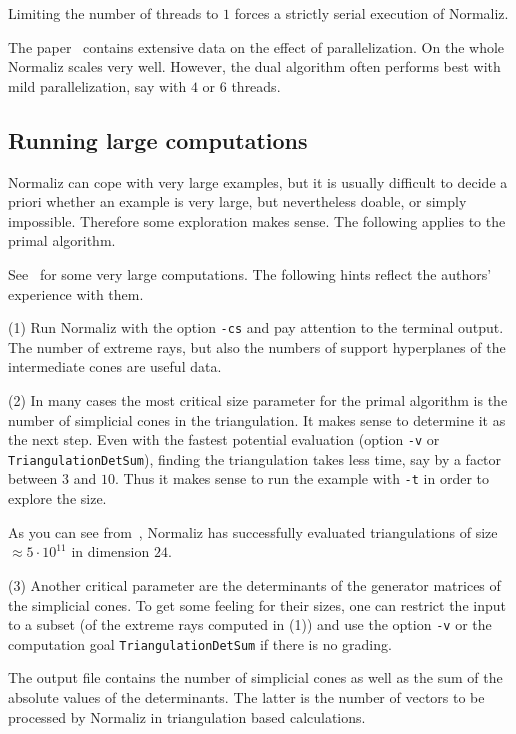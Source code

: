 \documentclass[12pt,a4paper]{scrartcl}
\theoremstyle{definition}
\def\ttt{\texttt}
\begin{document}
Limiting the number of threads to $1$ forces a strictly serial
execution of Normaliz.

The paper~\cite{BIS} contains extensive data on the effect of parallelization. On the whole Normaliz scales very well.
However, the dual algorithm often performs best with mild parallelization, say with $4$ or $6$ threads.

\subsection{Running large computations}\label{Large}

Normaliz can cope with very large examples, but it
is usually difficult to decide a priori whether an example is
very large, but nevertheless doable, or simply impossible.
Therefore some exploration makes sense. The following applies to the primal algorithm.

See~\cite{BIS} for some very large computations. The following
hints reflect the authors' experience with them.

(1) Run Normaliz with the option \ttt{-cs} and pay attention
to the terminal output. The number of extreme rays, but also
the numbers of support hyperplanes of the intermediate cones
are useful data.

(2) In many cases the most critical size parameter for the primal algorithm is the
number of simplicial cones in the triangulation. It makes sense
to determine it as the next step. Even with the fastest
potential evaluation (option \ttt{-v} or \verb|TriangulationDetSum|), finding the
triangulation takes less time, say by a factor between $3$ and
$10$. Thus it makes sense to run the example with \ttt{-t} in
order to explore the size.

As you can see from~\cite{BIS}, Normaliz has successfully
evaluated triangulations of size $\approx 5\cdot 10^{11}$ in
dimension $24$.

(3) Another critical parameter are the determinants of the
generator matrices of the simplicial cones. To get some feeling
for their sizes, one can restrict the input to a subset (of the
extreme rays computed in (1)) and use the option \ttt{-v} or the computation goal \verb|TriangulationDetSum| if there is no grading.

The output file contains the number of simplicial cones as well
as the sum of the absolute values of the determinants. The
latter is the number of vectors to be processed by Normaliz
in triangulation based calculations.
\end{document}
